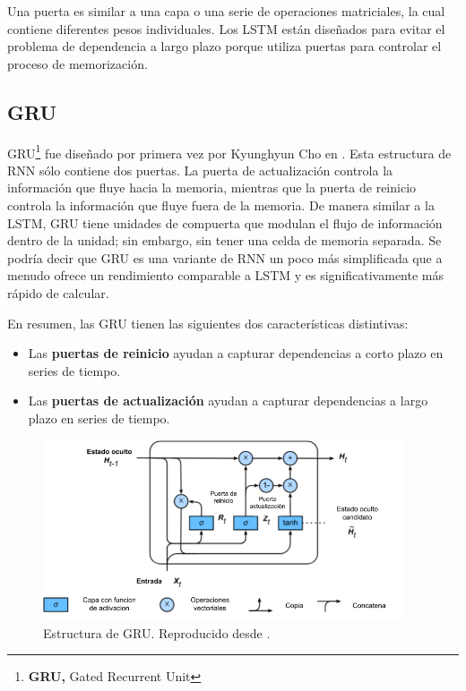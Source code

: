 \vspace{5mm} %

Una puerta es similar a una capa o una serie de operaciones matriciales, la cual contiene diferentes pesos individuales. Los LSTM est\'{a}n dise\~{n}ados para evitar el problema de dependencia a largo plazo porque utiliza puertas para controlar el proceso de memorizaci\'{o}n. 

\subsection{GRU}

GRU\footnote{\textbf{GRU, }Gated Recurrent Unit} fue dise\~{n}ado por primera vez por Kyunghyun Cho en \cite{55}. Esta estructura de RNN s\'{o}lo contiene dos puertas. La puerta de actualizaci\'{o}n controla la informaci\'{o}n que fluye hacia la memoria, mientras que la puerta de reinicio controla la informaci\'{o}n que fluye fuera de la memoria. De manera similar a la LSTM, GRU tiene unidades de compuerta que modulan el flujo de informaci\'{o}n dentro de la unidad; sin embargo, sin tener una celda de memoria separada. Se podr\'{i}a decir que GRU es una variante de RNN un poco m\'{a}s simplificada que a menudo ofrece un rendimiento comparable a LSTM y es significativamente m\'{a}s r\'{a}pido de calcular.

\vspace{5mm} %

En resumen, las GRU tienen las siguientes dos caracter\'{i}sticas distintivas:

\begin{itemize}
\item Las \textbf{puertas de reinicio} ayudan a capturar dependencias a corto plazo en series de tiempo.
\item Las \textbf{puertas de actualizaci\'{o}n} ayudan a capturar dependencias a largo plazo en series de tiempo.
\end{itemize}

\begin{figure}[h!]
  \begin{center}	\includegraphics[width=0.95\textwidth]{imagenes/Cap4/gru}
  \caption{Estructura de GRU. Reproducido desde \cite{56}.} 
  \label{fig:gru}
  \end{center}
\end{figure}

